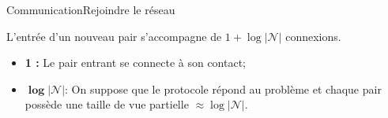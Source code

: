 \begin{frame}{Communication}{Rejoindre le réseau}

  L'entrée d'un nouveau pair s'accompagne de $1+ \log {|\mathcal{N}|}$
  connexions.

  \vspace{0.5cm}
  
  \begin{itemize}
  \item \textbf{1 :} Le pair entrant se connecte à son contact;
  \item $\pmb{\log |\mathcal{N}|}$: On suppose que le protocole répond au
    problème et chaque pair possède une taille de vue partielle
    $\approx \log |\mathcal{N}|$.
  \end{itemize}

  \vspace{1cm}

  \begin{minipage}{0.32\textwidth}
    \begin{center}
      
    \end{center}
  \end{minipage}
  \begin{minipage}{0.32\textwidth}
    \begin{center}
      
    \end{center}
  \end{minipage}
  \begin{minipage}{0.32\textwidth}
    \begin{center}
      
    \end{center}
  \end{minipage}






  

\end{frame}
